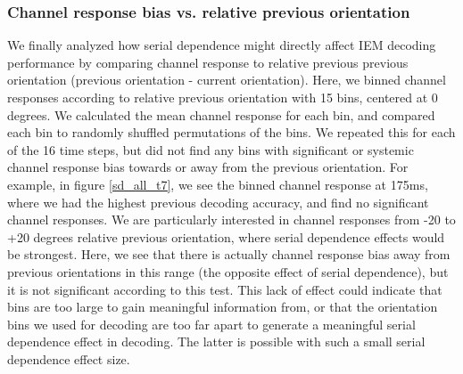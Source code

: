 \documentclass[../main.tex]{subfiles}
\begin{document}
\subsubsection{Channel response bias vs. relative previous orientation}
We finally analyzed how serial dependence might directly affect IEM decoding performance by comparing channel response to relative previous previous orientation (previous orientation - current orientation). Here, we binned channel responses according to relative previous orientation with 15 bins, centered at 0 degrees. We calculated the mean channel response for each bin, and compared each bin to randomly shuffled permutations of the bins. We repeated this for each of the 16 time steps, but did not find any bins with significant or systemic channel response bias towards or away from the previous orientation. For example, in figure \ref{sd_all_t7}, we see the binned channel response at 175ms, where we had the highest previous decoding accuracy, and find no significant channel responses. We are particularly interested in channel responses from -20 to +20 degrees relative previous orientation, where serial dependence effects would be strongest. Here, we see that there is actually channel response bias away from previous orientations in this range (the opposite effect of serial dependence), but it is not significant according to this test. This lack of effect could indicate that bins are too large to gain meaningful information from, or that the orientation bins we used for decoding are too far apart to generate a meaningful serial dependence effect in decoding. The latter is possible with such a small serial dependence effect size.
\end{document}
